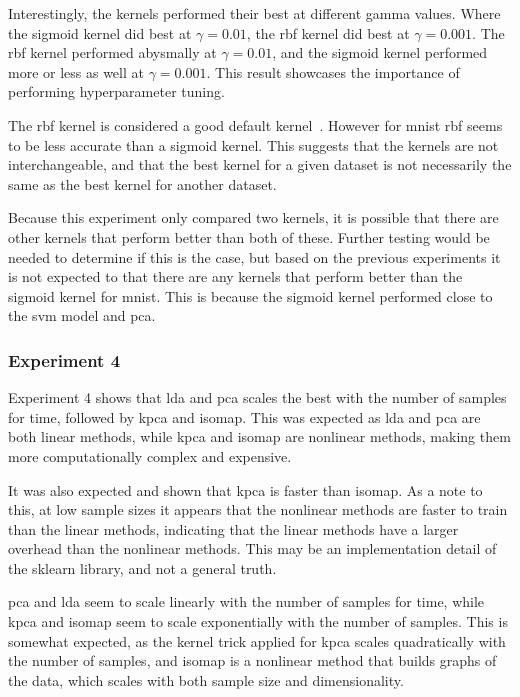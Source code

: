 Interestingly, the kernels performed their best at different gamma values. Where the sigmoid kernel did best at $\gamma = 0.01$, the \gls{rbf} kernel did best at $\gamma = 0.001$. The \gls{rbf} kernel performed abysmally at $\gamma = 0.01$, and the sigmoid kernel performed more or less as well at $\gamma = 0.001$. This result showcases the importance of performing hyperparameter tuning.

The \gls{rbf} kernel is considered a good default kernel~\cite{scikit-learn}. However for \gls{mnist} \gls{rbf} seems to be less accurate than a sigmoid kernel. This suggests that the kernels are not interchangeable, and that the best kernel for a given dataset is not necessarily the same as the best kernel for another dataset.

Because this experiment only compared two kernels, it is possible that there are other kernels that perform better than both of these. Further testing would be needed to determine if this is the case, but based on the previous experiments it is not expected to that there are any kernels that perform better than the sigmoid kernel for \gls{mnist}. This is because the sigmoid kernel performed close to the \gls{svm} model and \gls{pca}.


\subsubsection{Experiment 4}\label{subsec:experiment-4}
Experiment 4 shows that \gls{lda} and \gls{pca} scales the best with the number of samples for time, followed by \gls{kpca} and \gls{isomap}. This was expected as \gls{lda} and \gls{pca} are both linear methods, while \gls{kpca} and \gls{isomap} are nonlinear methods, making them more computationally complex and expensive.

It was also expected and shown that \gls{kpca} is faster than \gls{isomap}. As a note to this, at low sample sizes it appears that the nonlinear methods are faster to train than the linear methods, indicating that the linear methods have a larger overhead than the nonlinear methods. This may be an implementation detail of the \gls{sklearn} library, and not a general truth.

\gls{pca} and \gls{lda} seem to scale linearly with the number of samples for time, while \gls{kpca} and \gls{isomap} seem to scale exponentially with the number of samples. This is somewhat expected, as the kernel trick applied for \gls{kpca} scales quadratically with the number of samples, and \gls{isomap} is a nonlinear method that builds graphs of the data, which scales with both sample size and dimensionality.

